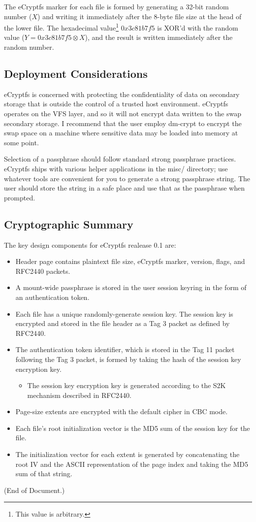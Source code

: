 \documentclass{article}
\begin{document}
The eCryptfs marker for each file is formed by generating a 32-bit
random number ($X$) and writing it immediately after the 8-byte file
size at the head of the lower file. The hexadecimal
value\footnote{This value is arbitrary.} $0x3c81b7f5$ is XOR'd with
the random value ($Y=0x3c81b7f5\otimes X$), and the result is written
immediately after the random number.

\subsection{Deployment Considerations}

eCryptfs is concerned with protecting the confidentiality of data on
secondary storage that is outside the control of a trusted host
environment. eCryptfs operates on the VFS layer, and so it will not
encrypt data written to the swap secondary storage. I recommend that
the user employ dm-crypt to encrypt the swap space on a machine where
sensitive data may be loaded into memory at some point.

Selection of a passphrase should follow standard strong passphrase
practices. eCryptfs ships with various helper applications in the
misc/ directory; use whatever tools are convenient for you to generate
a strong passphrase string. The user should store the string in a safe
place and use that as the passphrase when prompted.

\subsection{Cryptographic Summary}

The key design components for eCryptfs realease 0.1 are:

\begin{itemize}
\item{Header page contains plaintext file size, eCryptfs marker,
  version, flags, and RFC2440 packets.}
\item{A mount-wide passphrase is stored in the user session keyring in
  the form of an authentication token.}
\item{Each file has a unique randomly-generate session key. The
  session key is encrypted and stored in the file header as a Tag 3
  packet as defined by RFC2440.}
\item{The authentication token identifier, which is stored in the Tag
  11 packet following the Tag 3 packet, is formed by taking the hash
  of the session key encryption key.}
  \begin{itemize}
  \item{The session key encryption key is
    generated according to the S2K mechanism described in RFC2440.}
  \end{itemize}
\item{Page-size extents are encrypted with the default cipher in CBC
  mode.}
\item{Each file's root initialization vector is the MD5 sum of the
  session key for the file.}
\item{The initialization vector for each extent is generated by
  concatenating the root IV and the ASCII representation of the page
  index and taking the MD5 sum of that string.}
\end{itemize}

(End of Document.)
\end{document}
